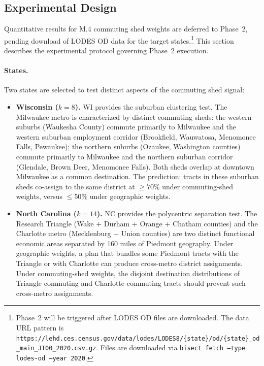 \label{sec:results}

\subsection{Experimental Design}

Quantitative results for M.4 commuting shed weights are deferred to Phase~2,
pending download of LODES OD data for the target states.\footnote{Phase~2
will be triggered after LODES OD files are downloaded.
The data URL pattern is
\texttt{https://lehd.ces.census.gov/data/lodes/LODES8/\{state\}/od/\{state\}\_od\_main\_JT00\_2020.csv.gz}.
Files are downloaded via \texttt{bisect fetch --type lodes-od --year 2020}.}
This section describes the experimental protocol governing Phase~2 execution.

\paragraph{States.}
Two states are selected to test distinct aspects of the commuting shed signal:

\begin{itemize}
  \item \textbf{Wisconsin ($k=8$).}
    WI provides the suburban clustering test.
    The Milwaukee metro is characterized by distinct commuting sheds:
    the western suburbs (Waukesha County) commute primarily to Milwaukee
    and the western suburban employment corridor (Brookfield, Wauwatosa,
    Menomonee Falls, Pewaukee); the northern suburbs (Ozaukee, Washington
    counties) commute primarily to Milwaukee and the northern suburban
    corridor (Glendale, Brown Deer, Menomonee Falls).
    Both sheds overlap at downtown Milwaukee as a common destination.
    The prediction: tracts in these suburban sheds co-assign to the same
    district at ${\geq}70\%$ under commuting-shed weights, versus
    ${\leq}50\%$ under geographic weights.
  \item \textbf{North Carolina ($k=14$).}
    NC provides the polycentric separation test.
    The Research Triangle (Wake + Durham + Orange + Chatham counties) and
    the Charlotte metro (Mecklenburg + Union counties) are two distinct
    functional economic areas separated by 160 miles of Piedmont geography.
    Under geographic weights, a plan that bundles some Piedmont tracts with
    the Triangle or with Charlotte can produce cross-metro district assignments.
    Under commuting-shed weights, the disjoint destination distributions of
    Triangle-commuting and Charlotte-commuting tracts should prevent such
    cross-metro assignments.
\end{itemize}

